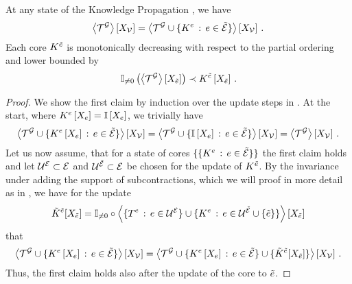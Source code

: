 \begin{theorem}\label{the:soundnessKnowledgePropagation}
	At any state of the Knowledge Propagation , we have
	\begin{align*}
		\left\langle \mathcal{T}^{\mathcal{G}}\right\rangle \left[ X_{\mathcal{V}} \right]
		= \left\langle \mathcal{T}^{\mathcal{G}} \cup \{K^{e} \, : \, e\in\tilde{\mathcal{E}}\}\right\rangle \left[ X_{\mathcal{V}} \right] \, .
	\end{align*}
	Each core $K^{\tilde{e}}$ is monotonically decreasing with respect to the partial ordering and lower bounded by
	\begin{align*}
		\mathbb{I}_{\neq0}\left(\left\langle \mathcal{T}^{\mathcal{G}}\right\rangle \left[ X_{\tilde{e}} \right]\right) \prec K^{\tilde{e}}\left[X_{\tilde{e}}\right] \, .
	\end{align*}
\end{theorem}
\begin{proof}
	We show the first claim by induction over the update steps in .
	At the start, where $K^{e}\left[X_{e}\right] = \mathbb{I}\left[X_{e}\right]$, we trivially have
	\begin{align*}
		\left\langle \mathcal{T}^{\mathcal{G}} \cup \{K^{e}\left[X_{e}\right] \, : \, e\in\tilde{\mathcal{E}}\}\right\rangle \left[ X_{\mathcal{V}} \right]
		= \left\langle \mathcal{T}^{\mathcal{G}} \cup \{\mathbb{I}\left[X_{e}\right] \, : \, e\in\tilde{\mathcal{E}}\}\right\rangle \left[ X_{\mathcal{V}} \right]
		= \left\langle \mathcal{T}^{\mathcal{G}}\right\rangle \left[ X_{\mathcal{V}} \right] \, .
	\end{align*}
	Let us now assume, that for a state of cores $\{\{K^{e} \, : \, e\in\tilde{\mathcal{E}}\}\}$ the first claim holds and let $\mathcal{U}^{\mathcal{E}}\subset\mathcal{E}$ and $\mathcal{U}^{\tilde{\mathcal{E}}}\subset\mathcal{E}$ be chosen for the update of $K^{\tilde{e}}$.
	By the invariance under adding the support of subcontractions, which we will proof in more detail as  in , we have for the update
	\begin{align*}
		\tilde{K}^{\tilde{e}}[X_{\tilde{e}}]
		= \mathbb{I}_{\neq0}\circ\left\langle 
			\{T^{e} \, : \, e\in\mathcal{U}^{\mathcal{E}}\} \cup \{K^{e} \, : \, e\in\mathcal{U}^{\tilde{\mathcal{E}}}\cup\{\tilde{e}\}\}
		\right\rangle \left[ X_{\tilde{e}} \right]
	\end{align*}
	that
	\begin{align*}
		\left\langle \mathcal{T}^{\mathcal{G}} \cup \{K^{e}\left[X_{e}\right] \, : \, e\in\tilde{\mathcal{E}}\}\right\rangle \left[ X_{\mathcal{V}} \right]
		= \left\langle \mathcal{T}^{\mathcal{G}} \cup \{K^{e}\left[X_{e}\right] \, : \, e\in\tilde{\mathcal{E}}\} \cup \{\tilde{K}^{\tilde{e}}[X_{\tilde{e}}]\}
		\right\rangle \left[ X_{\mathcal{V}} \right]  \, .
	\end{align*}
	Thus, the first claim holds also after the update of the core to $\tilde{e}$.


\end{proof}
